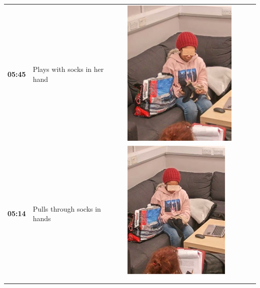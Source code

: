 \documentclass[twocolumn, serif, empirical, authordate]{jote-article}
\begin{document}
\begin{table}[ht!]
\begin{mdframed}[linecolor=jotedark]
\begin{tabularx}{\linewidth}{@{} m{.05\linewidth} m{.2\linewidth} >{\raggedleft\arraybackslash}m{.19\linewidth}  m{.05\linewidth} m{.2\linewidth} >{\raggedleft\arraybackslash}m{.19\linewidth} }
 \textbf{05:45} & Plays with socks in her hand & \includegraphics[height=.15\textheight, width=.8\linewidth]{media/image12.png} \\
 \textbf{05:14} & Pulls through socks in hands & \includegraphics[height=.15\textheight, width=.8\linewidth]{media/image8.png} &

\end{tabularx}
\end{mdframed}
\end{table}
\end{document}
